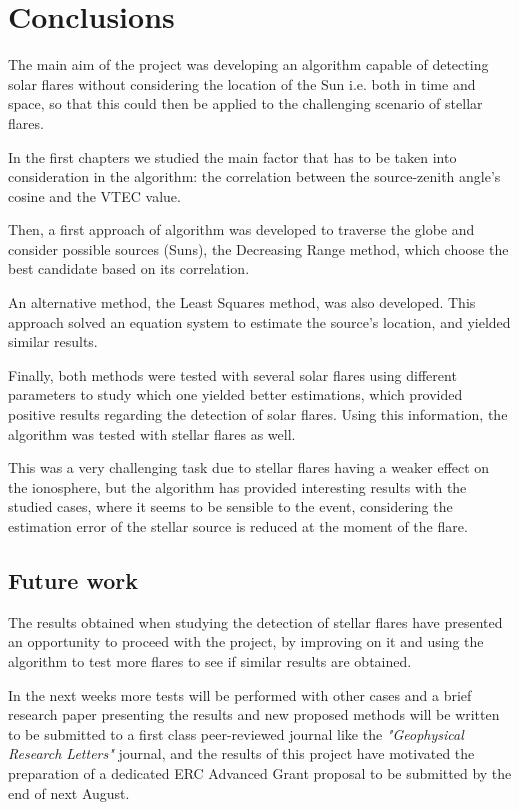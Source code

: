 \chapter{Conclusions}

The main aim of the project was developing an algorithm capable of detecting solar flares without considering the location of the Sun i.e. both in time and space, so that this could then be applied to the challenging scenario of stellar flares.

In the first chapters we studied the main factor that has to be taken into consideration in the algorithm: the correlation between the source-zenith angle's cosine and the VTEC value.

Then, a first approach of algorithm was developed to traverse the globe and consider possible sources (Suns), the Decreasing Range method, which choose the best candidate based on its correlation.

An alternative method, the Least Squares method, was also developed. This approach solved an equation system to estimate the source's location, and yielded similar results.

Finally, both methods were tested with several solar flares using different parameters to study which one yielded better estimations, which provided positive results regarding the detection of solar flares. Using this information, the algorithm was tested with stellar flares as well.

This was a very challenging task due to stellar flares having a weaker effect on the ionosphere, but the algorithm has provided interesting results with the studied cases, where it seems to be sensible to the event, considering the estimation error of the stellar source is reduced at the moment of the flare.
 
\section{Future work}

The results obtained when studying the detection of stellar flares have presented an opportunity to proceed with the project, by improving on it and using the algorithm to test more flares to see if similar results are obtained.

In the next weeks more tests will be performed with other cases and a brief research paper presenting the results and new proposed methods will be written to be submitted to a first class peer-reviewed journal like the \textit{"Geophysical Research Letters"} journal, and the results of this project have motivated the preparation of a dedicated ERC Advanced Grant proposal to be submitted by the end of next August.

